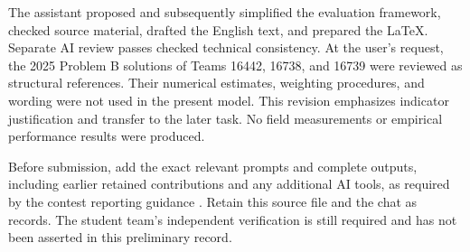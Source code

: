 \documentclass[12pt]{article}
\begin{document}
The assistant proposed and subsequently simplified the evaluation framework,
checked source material, drafted the English text, and prepared the LaTeX.
Separate AI review passes checked technical consistency. At the user's request,
the 2025 Problem B solutions of Teams 16442, 16738, and 16739 were reviewed as
structural references. Their numerical estimates, weighting procedures, and
wording were not used in the present model. This revision emphasizes indicator
justification and transfer to the later task. No field measurements or empirical
performance results were produced.

Before submission, add the exact relevant prompts and complete outputs,
including earlier retained contributions and any additional AI tools, as
required by the contest reporting guidance \cite{aipolicy}. Retain this source
file and the chat as records. The student team's independent verification is
still required and has not been asserted in this preliminary record.
\end{document}
